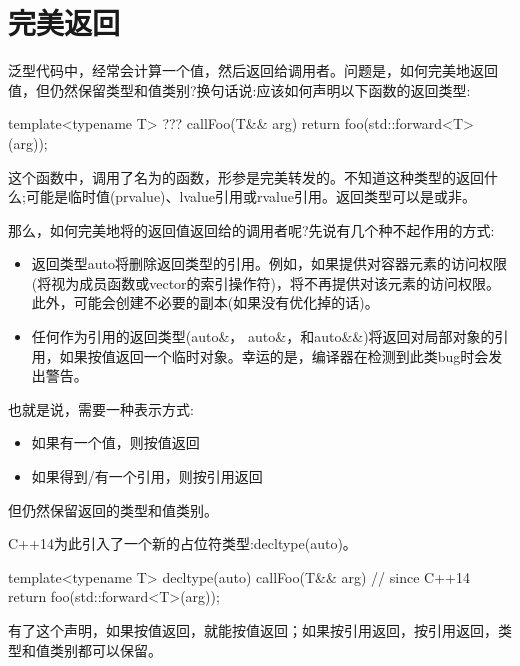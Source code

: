 \section{完美返回}
泛型代码中，经常会计算一个值，然后返回给调用者。问题是，如何完美地返回值，但仍然保留类型和值类别?换句话说:应该如何声明以下函数的返回类型:

\begin{cppcode}
template<typename T>
??? callFoo(T&& arg)
{
	return foo(std::forward<T>(arg));
}
\end{cppcode}

这个函数中，调用了名为的函数，形参是完美转发的。不知道这种类型的返回什么;可能是临时值(prvalue)、lvalue引用或rvalue引用。返回类型可以是或非。

那么，如何完美地将的返回值返回给的调用者呢?先说有几个种不起作用的方式:

\begin{itemize}
	\item 返回类型auto将删除返回类型的引用。例如，如果提供对容器元素的访问权限(将视为成员函数或vector的索引操作符)，将不再提供对该元素的访问权限。此外，可能会创建不必要的副本(如果没有优化掉的话)。
	\item 任何作为引用的返回类型(auto\&，  auto\&，和auto\&\&)将返回对局部对象的引用，如果按值返回一个临时对象。幸运的是，编译器在检测到此类bug时会发出警告。
\end{itemize}

也就是说，需要一种表示方式:

\begin{itemize}
	\item 如果有一个值，则按值返回
	\item 如果得到/有一个引用，则按引用返回
\end{itemize}

但仍然保留返回的类型和值类别。

C++14为此引入了一个新的占位符类型:decltype(auto)。

\begin{cppcode}
template<typename T>
decltype(auto) callFoo(T&& arg) // since C++14
{
	return foo(std::forward<T>(arg));
}
\end{cppcode}

有了这个声明，如果按值返回，就能按值返回；如果按引用返回，按引用返回，类型和值类别都可以保留。











































